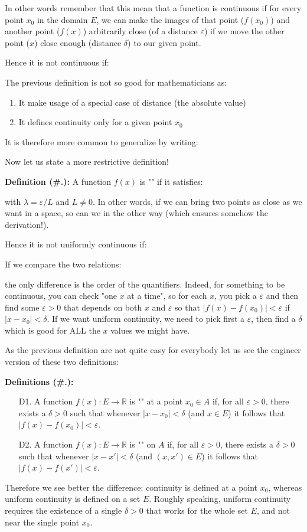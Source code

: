 	In other words remember that this mean that a function is continuous if for every point $x_0$ in the domain $E$, we can make the images of that point ($f(x_0)$) and another point ($f(x)$) arbitrarily close (of a distance $\varepsilon$) if we move the other point ($x$) close enough (distance $\delta$) to our given point.
	
	Hence it is not continuous if:
	
	
	The previous definition is not so good for mathematicians as:
	\begin{enumerate}
		\item It make usage of a special case of distance (the absolute value)
		
		\item It defines continuity only for a given point $x_0$
	\end{enumerate}
	It is therefore more common to generalize by writing:
	
	
	Now let us state a more restrictive definition!
	
	\textbf{Definition (\#\thesection.\mydef):} A function $f(x)$ is "" if it satisfies:
	
	with $\lambda=\varepsilon/L$ and $L\neq 0$. In other words, if we can bring two points as close as we want in a space, so can we in the other way (which ensures somehow the derivation!).
	
	Hence it is not uniformly continuous if:
	
	If we compare the two relations:
	
	the only difference is the order of the quantifiers. Indeed, for something to be continuous, you can check "one $x$ at a time", so for each $x$, you pick a $\varepsilon$ and then find some $\varepsilon>0$ that depends on both $x$ and $\varepsilon$ so that $|f(x)-f(x_0)|<\varepsilon$ if $|x-x_0|<\delta$. If we want uniform continuity, we need to pick first a $\varepsilon$, then find a $\delta$ which is good for ALL the $x$ values we might have.
	
	As the previous definition are not quite easy for everybody let us see the engineer version of these two definitions:
	
	\pagebreak
	\textbf{Definitions (\#\thesection.\mydef):}
	\begin{enumerate}
		\item[D1.] A function $f(x):E \rightarrow \mathbb{R}$ is "" at a point $x_0\in A$ if, for all $\varepsilon>0$, there exists a $\delta>0$ such that whenever $|x-x_0|<\delta$ (and $x\in E$) it follows that $|f(x)-f(x_0)|<\varepsilon$.
		
		\item[D2.] A function $f(x):E \rightarrow \mathbb{R}$ is "" on $A$ if, for all $\varepsilon>0$, there exists a $\delta>0$ such that whenever $|x-x'|<\delta$ (and $(x,x')\in E$) it follows that $|f(x)-f(x')|<\varepsilon$.
	\end{enumerate}
	Therefore we see better the difference: continuity is defined at a point $x_0$, whereas uniform continuity is defined on a set $E$. Roughly speaking, uniform continuity requires the existence of a single $\delta>0$ that works for the whole set $E$, and not near the single point $x_0$.
	

